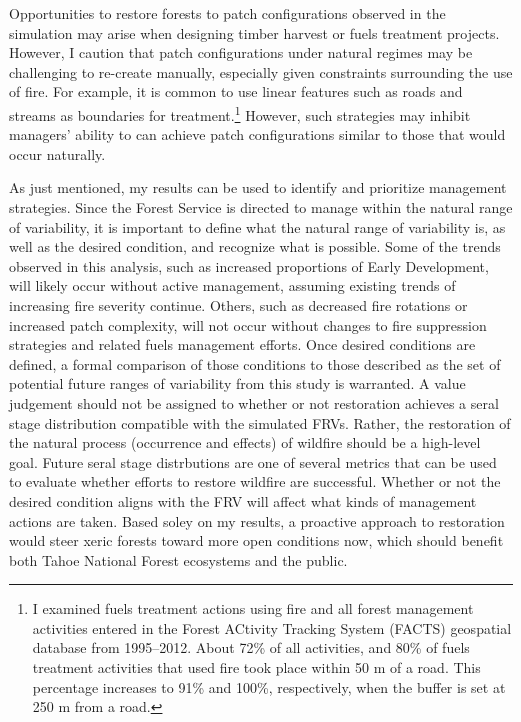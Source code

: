 Opportunities to restore forests to patch configurations observed in the simulation may arise when designing timber harvest or fuels treatment projects. However, I caution that patch configurations under natural regimes may be challenging to re-create manually, especially given constraints surrounding the use of fire. For example, it is common to use linear features such as roads and streams as boundaries for treatment.\footnote{I examined fuels treatment actions using fire and all forest management activities entered in the Forest ACtivity Tracking System (FACTS) geospatial database from 1995--2012. About 72\% of all activities, and 80\% of fuels treatment activities that used fire took place within 50 m of a road. This percentage increases to 91\% and 100\%, respectively, when the buffer is set at 250 m from a road.} However, such strategies may inhibit managers' ability to can achieve patch configurations similar to those that would occur naturally.

As just mentioned, my results can be used to identify and prioritize management strategies. Since the Forest Service is directed to manage within the natural range of variability, it is important to define what the natural range of variability is, as well as the desired condition, and recognize what is possible. Some of the trends observed in this analysis, such as increased proportions of Early Development, will likely occur without active management, assuming existing trends of increasing fire severity continue. Others, such as decreased fire rotations or increased patch complexity, will not occur without changes to fire suppression strategies and related fuels management efforts. Once desired conditions are defined, a formal comparison of those conditions to those described as the set of potential future ranges of variability from this study is warranted. A value judgement should not be assigned to whether or not restoration achieves a seral stage distribution compatible with the simulated FRVs. Rather, the restoration of the natural process (occurrence and effects) of wildfire should be a high-level goal. Future seral stage distrbutions are one of several metrics that can be used to evaluate whether efforts to restore wildfire are successful. Whether or not the desired condition aligns with the FRV will affect what kinds of management actions are taken. Based soley on my results, a proactive approach to restoration would steer xeric forests toward more open conditions now, which should benefit both Tahoe National Forest ecosystems and the public.

